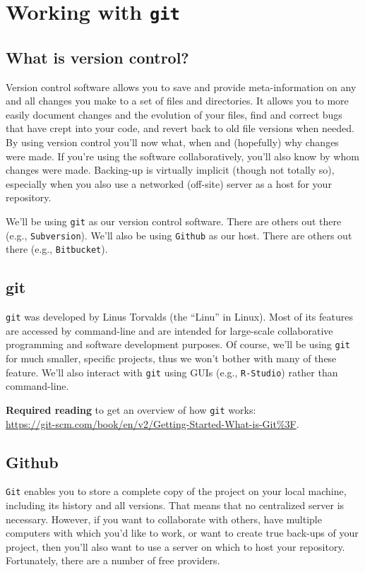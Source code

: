 \documentclass[12pt,letterpaper]{article}
\begin{document}
\pagebreak

\section{Working with \texttt{git}}

\subsection{What is version control?}
Version control software allows you to save and provide meta-information on any and all changes you make to a set of files and directories.  It allows you to more easily document changes and the evolution of your files, find and correct bugs that have crept into your code, and revert back to old file versions when needed.  By using version control you'll now what, when and (hopefully) why changes were made.  If you're using the software collaboratively, you'll also know by whom changes were made.  Backing-up is virtually implicit (though not totally so), especially when you also use a networked (off-site) server as a host for your repository.

We'll be using \texttt{git} as our version control software.  There are others out there (e.g., \texttt{Subversion}).  We'll also be using \texttt{Github} as our host.  There are others out there (e.g., \texttt{Bitbucket}).

\subsection{git}
\texttt{git} was developed by Linus Torvalds (the ``Linu'' in Linux).  Most of its features are accessed by command-line and are intended for large-scale collaborative programming and software development purposes.  Of course, we'll be using \texttt{git} for much smaller, specific projects, thus we won't bother with many of these feature.  We'll also interact with \texttt{git} using GUIs (e.g., \texttt{R-Studio}) rather than command-line.  

\textbf{Required reading} to get an overview of how \texttt{git} works:\\
\url{https://git-scm.com/book/en/v2/Getting-Started-What-is-Git%3F}.

\subsection{Github}
\texttt{Git} enables you to store a complete copy of the project on your local machine, including its history and all versions.  That means that no centralized server is necessary.  However, if you want to collaborate with others, have multiple computers with which you'd like to work, or want to create true back-ups of your project, then you'll also want to use a server on which to host your repository.  Fortunately, there are a number of free providers. 
\end{document}
